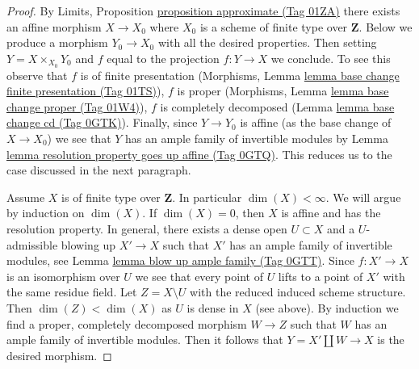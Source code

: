 \documentclass{amsart}
\theoremstyle{plain}
\theoremstyle{definition}
\theoremstyle{remark}
\numberwithin{equation}{subsection}
\begin{document}
\begin{proof}
By Limits, Proposition \href{https://stacks.math.columbia.edu/tag/01ZA}{proposition approximate (Tag 01ZA)}
there exists an affine morphism $X \to X_0$ where $X_0$
is a scheme of finite type over $\mathbf{Z}$. Below we produce
a morphism $Y_0 \to X_0$ with all the desired properties.
Then setting $Y = X \times_{X_0} Y_0$ and $f$ equal to
the projection $f : Y \to X$ we conclude.
To see this observe that $f$ is of finite presentation
(Morphisms, Lemma \href{https://stacks.math.columbia.edu/tag/01TS}{lemma base change finite presentation (Tag 01TS)}),
$f$ is proper
(Morphisms, Lemma \href{https://stacks.math.columbia.edu/tag/01W4}{lemma base change proper (Tag 01W4)}),
$f$ is completely decomposed
(Lemma \href{https://stacks.math.columbia.edu/tag/0GTK}{lemma base change cd (Tag 0GTK)}). Finally, since $Y \to Y_0$ is
affine (as the base change of $X \to X_0$) we see that $Y$ has
an ample family of invertible modules by
Lemma \href{https://stacks.math.columbia.edu/tag/0GTQ}{lemma resolution property goes up affine (Tag 0GTQ)}.
This reduces us to the case discussed in the next paragraph.

\medskip\noindent
Assume $X$ is of finite type over $\mathbf{Z}$. In particular
$\dim(X) < \infty$. We will argue by induction on $\dim(X)$.
If $\dim(X) = 0$, then $X$ is affine and has the resolution property.
In general, there exists a dense open $U \subset X$ and a
$U$-admissible blowing up $X' \to X$ such that $X'$ has
an ample family of invertible modules, see
Lemma \href{https://stacks.math.columbia.edu/tag/0GTT}{lemma blow up ample family (Tag 0GTT)}.
Since $f : X' \to X$ is an isomorphism over $U$
we see that every point of $U$ lifts to a point of $X'$
with the same residue field.
Let $Z = X \setminus U$ with the reduced induced scheme structure.
Then $\dim(Z) < \dim(X)$ as $U$ is dense in $X$ (see above).
By induction we find a proper, completely decomposed
morphism $W \to Z$ such that $W$ has an ample family of invertible
modules. Then it follows that $Y = X' \amalg W \to X$ is the desired
morphism.
\end{proof}
\end{document}
